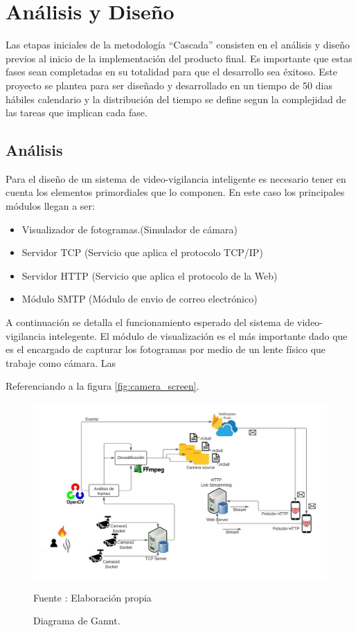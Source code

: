 \chapter{Análisis y Diseño}

Las etapas iniciales de la metodología ``Cascada'' consisten en el análisis y diseño previos al inicio de la implementación del producto final. Es importante que estas fases sean completadas en su totalidad para que el desarrollo sea éxitoso. Este proyecto se plantea para ser diseñado y desarrollado en un tiempo de 50 dias hábiles calendario y la distribución del tiempo se define segun la complejidad de las tareas que implican cada fase.

\section{Análisis}
Para el diseño de un sistema de video-vigilancia inteligente es necesario tener en cuenta los elementos primordiales que lo componen. En este caso los principales módulos llegan a ser:
\begin{itemize}
    \item Visualizador de fotogramas.(Simulador de cámara)
    \item Servidor TCP (Servicio que aplica el protocolo TCP/IP)
    \item Servidor HTTP (Servicio que aplica el protocolo de la Web)
    \item Módulo SMTP (Módulo de envio de correo electrónico)
\end{itemize}

A continuación se detalla el funcionamiento esperado del sistema de video-vigilancia intelegente. El módulo de visualización es el más importante dado que es el encargado de capturar los fotogramas por medio de un lente físico que trabaje como cámara. Las

Referenciando a la figura \ref{fig:camera_screen}.
\begin{figure}[H]
    \begin{center}
        \includegraphics[width=15cm]{img/capitulo_4/main.jpeg}
        \caption{Diagrama de Gannt.}
        Fuente : Elaboración propia
        \label{fig:webcamera}
    \end{center}
\end{figure}

